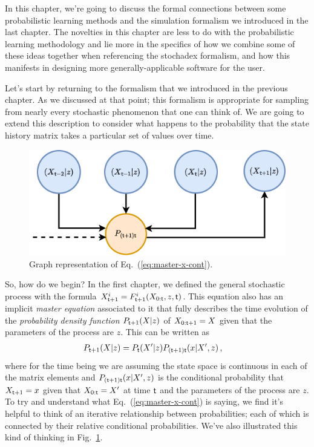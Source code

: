 In this chapter, we're going to discuss the formal connections between some probabilistic learning methods and the simulation formalism we introduced in the last chapter. The novelties in this chapter are less to do with the probabilistic learning methodology and lie more in the specifics of how we combine some of these ideas together when referencing the stochadex formalism, and how this manifests in designing more generally-applicable software for the user.

Let's start by returning to the formalism that we introduced in the previous chapter. As we discussed at that point; this formalism is appropriate for sampling from nearly every stochastic phenomenon that one can think of. We are going to extend this description to consider what happens to the probability that the state history matrix takes a particular set of values over time.

\begin{figure}[h]
\centering
\includegraphics[width=12cm]{images/chapter-2-master-eq-graph.drawio.png}
\caption{Graph representation of Eq.~(\ref{eq:master-x-cont}).}
\label{fig:master-eqn}
\end{figure} 

So, how do we begin? In the first chapter, we defined the general stochastic process with the formula $X^{i}_{{\sf t}+1} = F^{i}_{{\sf t}+1}(X_{0:{\sf t}},z,{\sf t})$. This equation also has an implicit \emph{master equation} associated to it that fully describes the time evolution of the \emph{probability density function} $P_{{\sf t}+1}(X\vert z)$ of $X_{0:{\sf t}+1}=X$ given that the parameters of the process are $z$. This can be written as
\begin{align}
P_{{\sf t}+1}(X\vert z) &= P_{{\sf t}}(X'\vert z) P_{({\sf t}+1){\sf t}}(x\vert X',z) \label{eq:master-x-cont}\,,
\end{align}
where for the time being we are assuming the state space is continuous in each of the matrix elements and $P_{({\sf t}+1){\sf t}}(x\vert X',z)$ is the conditional probability that $X_{{\sf t}+1}=x$ given that $X_{0:{\sf t}}=X'$ at time ${\sf t}$ and the parameters of the process are $z$. To try and understand what Eq.~(\ref{eq:master-x-cont}) is saying, we find it's helpful to think of an iterative relationship between probabilities; each of which is connected by their relative conditional probabilities. We've also illustrated this kind of thinking in Fig.~\ref{fig:master-eqn}.


